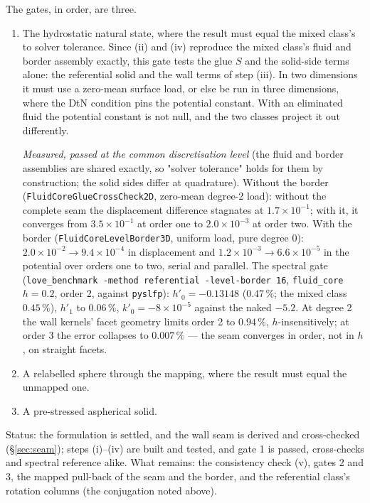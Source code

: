 \documentclass[11pt]{article}
\theoremstyle{definition}
\theoremstyle{remark}
\newcommand{\code}[1]{\texttt{#1}}
\begin{document}
The gates, in order, are three.
\begin{enumerate}
\item The hydrostatic natural state, where the result must equal the
  mixed class's to solver tolerance. Since (ii) and (iv) reproduce the
  mixed class's fluid and border assembly exactly, this gate tests the
  glue $S$ and the solid-side terms alone: the referential solid and
  the wall terms of step (iii). In two dimensions it must use a
  zero-mean surface load, or else be run in three dimensions, where
  the DtN condition pins the potential constant. With an eliminated
  fluid the potential constant is not null, and the two classes
  project it out differently.

  \emph{Measured, passed at the common discretisation level} (the
  fluid and border assemblies are shared exactly, so "solver
  tolerance" holds for them by construction; the solid sides differ at
  quadrature). Without the border (\code{FluidCoreGlueCrossCheck2D},
  zero-mean degree-2 load): without the complete seam the displacement
  difference stagnates at $1.7\times10^{-1}$; with it, it converges
  from $3.5\times10^{-1}$ at order one to $2.0\times10^{-3}$ at order
  two. With the border (\code{FluidCoreLevelBorder3D}, uniform load,
  pure degree 0): $2.0\times10^{-2} \to 9.4\times10^{-4}$ in
  displacement and $1.2\times10^{-3} \to 6.6\times10^{-5}$ in the
  potential over orders one to two, serial and parallel. The spectral
  gate (\code{love\_benchmark -method referential -level-border 16},
  \code{fluid\_core} $h = 0.2$, order 2, against \code{pyslfp}):
  $h'_0 = -0.13148$ ($0.47\,\%$; the mixed class $0.45\,\%$),
  $h'_1$ to $0.06\,\%$, $k'_0 = -8\times10^{-5}$ against the naked
  $-5.2$. At degree 2 the wall kernels' facet geometry limits order 2
  to $0.94\,\%$, $h$-insensitively; at order 3 the error collapses to
  $0.007\,\%$ — the seam converges in order, not in $h$, on straight
  facets.
\item A relabelled sphere through the mapping, where the result must
  equal the unmapped one.
\item A pre-stressed aspherical solid.
\end{enumerate}
Status: the formulation is settled, and the wall seam is derived and
cross-checked (\S\ref{sec:seam}); steps (i)--(iv) are built and
tested, and gate 1 is passed, cross-checks and spectral reference
alike. What remains: the consistency check (v), gates 2 and 3, the
mapped pull-back of the seam and the border, and the referential
class's rotation columns (the conjugation noted above).
\end{document}

